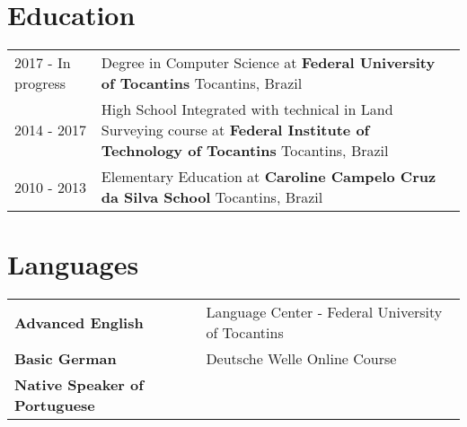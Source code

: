 \documentclass[a4paper,12pt]{article}
\begin{document}
\section{Education}
\begin{tabularx}{\linewidth}{@{}l X@{}}	
2017 - In progress & Degree in Computer Science at \textbf{Federal University of Tocantins} \hfill Tocantins, Brazil \\

2014 - 2017 & High School Integrated with technical in Land Surveying course at \textbf{Federal Institute of Technology of Tocantins} \hfill Tocantins, Brazil \\ 

2010 - 2013 & Elementary Education at \textbf{Caroline Campelo Cruz da Silva School} \hfill Tocantins, Brazil \\ 
\end{tabularx}


\section{Languages}
\begin{tabularx}{\linewidth}{@{}l X@{}}
\textbf{Advanced English} & \hfill Language Center - Federal University of Tocantins \\
\textbf{Basic German} & \hfill  Deutsche Welle Online Course \\  
\textbf{Native Speaker of Portuguese}
\end{tabularx}


\end{document}
